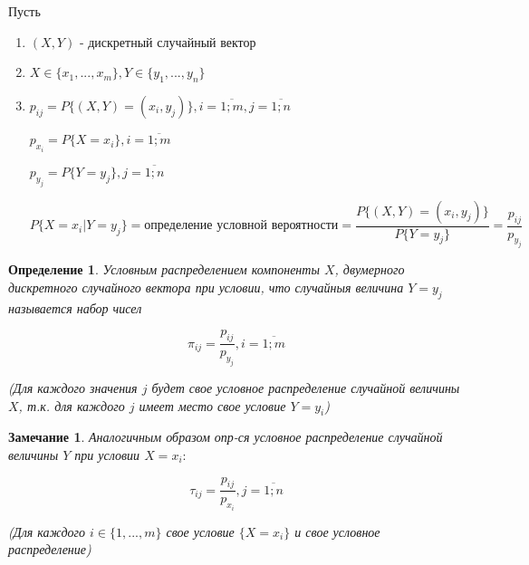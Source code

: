 \documentclass[a4paper, 14pt]{report}
\newtheorem{defenition}{Определение}[section]
\newtheorem{note}{Замечание}[section]
\begin{document}
Пусть

\begin{enumerate}
    \item $(X,Y)$ - дискретный случайный вектор
    \item $X \in \{x_1, ..., x_m\}, Y \in \{y_1, ..., y_n\}$
    \item $p_{ij} = P\{(X,Y) = (x_i, y_j)\}, i = \overline{1;m}, j = \overline{1;n}$

        $p_{x_i} = P\{X=x_i\}, i = \overline{1;m}$

        $p_{y_j} = P\{Y=y_j\}, j = \overline{1;n}$

        $$
        P\{ X=x_i | Y=y_j\} = \text{определение условной вероятности} = \frac{P\{(X,Y)=(x_i,y_j)\}}{P\{Y = y_j\}} = \frac{p_{ij}}{p_{y_j}}
        $$

\end{enumerate}

\begin{defenition}
    Условным распределением компоненты $X$, двумерного дискретного случайного вектора при условии, что случайныя величина $Y=y_j$ называется набор чисел

    $$
    \pi_{ij} = \frac{p_{ij}}{p_{y_j}}, i = \overline{1;m}
    $$

    (Для каждого значения $j$ будет свое условное распределение случайной величины $X$, т.к. для каждого $j$ имеет место свое условие $Y=y_i$)
\end{defenition}

\begin{note}
    Аналогичным образом опр-ся условное распределение случайной величины $Y$ при условии $X=x_i:$

    $$
    \tau_{ij} = \frac{p_{ij}}{p_{x_i}}, j = \overline{1;n}
    $$

    (Для каждого $i \in \{1,...,m\}$ свое условие $\{X=x_i\}$ и свое условное распределение)
\end{note}
\end{document}
